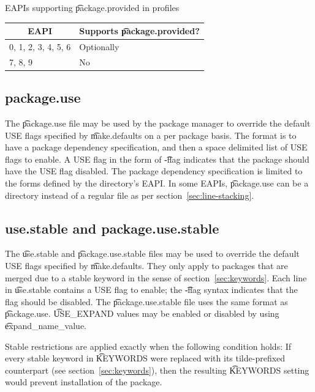 \begin{centertable}{EAPIs supporting \t{package.provided} in profiles}
    \label{tab:package-provided}
    \begin{tabular}{ll}
      \toprule
      \multicolumn{1}{c}{\textbf{EAPI}} &
      \multicolumn{1}{c}{\textbf{Supports \t{package.provided}?}} \\
      \midrule
      0, 1, 2, 3, 4, 5, 6 & Optionally \\
      7, 8, 9             & No         \\
      \bottomrule
    \end{tabular}
\end{centertable}

\subsection{package.use}
The \t{package.use} file may be used by the package manager to override the default USE flags
specified by \t{make.defaults} on a per package basis. The format is to have a package dependency
specification, and then a space delimited list of USE flags to enable. A USE flag in the form of
\t{-flag} indicates that the package should have the USE flag disabled. The package dependency
specification is limited to the forms defined by the directory's EAPI\@. In some EAPIs,
\t{package.use} can be a directory instead of a regular file as per section~\ref{sec:line-stacking}.

\subsection{use.stable and package.use.stable}
 The \t{use.stable} and \t{package.use.stable} files may be used to
override the default USE flags specified by \t{make.defaults}. They only apply to packages that
are merged due to a stable keyword in the sense of section~\ref{sec:keywords}. Each line in
\t{use.stable} contains a USE flag to enable; the \t{-flag} syntax indicates that the flag should
be disabled. The \t{package.use.stable} file uses the same format as \t{package.use}.
\t{USE_EXPAND} values may be enabled or disabled by using \t{expand_name_value}.

Stable restrictions are applied exactly when the following condition holds: If every stable keyword
in \t{KEYWORDS} were replaced with its tilde-prefixed counterpart (see section~\ref{sec:keywords}),
then the resulting \t{KEYWORDS} setting would prevent installation of the package.

